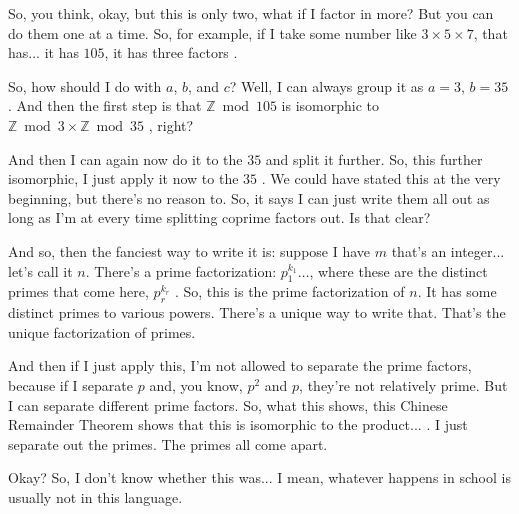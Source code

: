\begin{speech}[00:15:00 - 00:17:15]
So, you think, okay, but this is only two, what if I factor in more? But you can do them one at a time. So, for example, if I take some number like $3 \times 5 \times 7$, that has... it has $105$, it has three factors .

So, how should I do with $a$, $b$, and $c$? Well, I can always group it as $a = 3$, $b = 35$ . And then the first step is that $\mathbb{Z} \bmod 105$ is isomorphic to $\mathbb{Z} \bmod 3 \times \mathbb{Z} \bmod 35$ , right?

And then I can again now do it to the $35$ and split it further. So, this further isomorphic, I just apply it now to the $35$ . We could have stated this at the very beginning, but there's no reason to. So, it says I can just write them all out as long as I'm at every time splitting coprime factors out. Is that clear?

And so, then the fanciest way to write it is: suppose I have $m$ that's an integer... let's call it $n$. There's a prime factorization: $p_1^{k_1} \dots$, where these are the distinct primes that come here, $p_r^{k_r}$ . So, this is the prime factorization of $n$. It has some distinct primes to various powers. There's a unique way to write that. That's the unique factorization of primes.

And then if I just apply this, I'm not allowed to separate the prime factors, because if I separate $p$ and, you know, $p^2$ and $p$, they're not relatively prime. But I can separate different prime factors. So, what this shows, this Chinese Remainder Theorem shows that this is isomorphic to the product... . I just separate out the primes. The primes all come apart.

Okay? So, I don't know whether this was... I mean, whatever happens in school is usually not in this language.
\end{speech}

